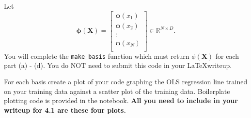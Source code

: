 \documentclass[submit]{harvardml}
\begin{document}
\begin{problem}
\begin{enumerate}
Let 
$$ \mathbf{\phi}(\mathbf{X}) = 
\begin{bmatrix} 
\mathbf{\phi}(x_1) \\
\mathbf{\phi}(x_2) \\
\vdots \\
\mathbf{\phi}(x_N) \\
\end{bmatrix} \in \mathbb{R}^{N\times D}.$$
You will complete the \verb|make_basis| function which must return
$\phi(\mathbf{X})$ for each part 
(a) - (d). You do NOT need to submit this
code in your \LaTeX writeup.


For each basis create a plot of your code graphing the OLS 
regression line trained on your training data against a 
scatter plot of the training data. Boilerplate plotting code
is provided in the notebook. \textbf{All you need to include 
in your writeup for 4.1 are these four plots.}
\vspace{1em}
\end{enumerate}
\end{problem}
\end{document}
